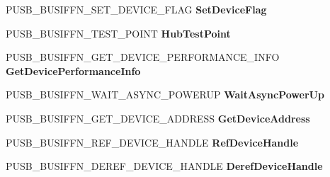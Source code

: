 \begin{DoxyCompactItemize}
\item 
\mbox{\label{struct___u_s_b___b_u_s___i_n_t_e_r_f_a_c_e___h_u_b___v7_ae7d1f58eb68748c858edb586650daecb}} 
P\+U\+S\+B\+\_\+\+B\+U\+S\+I\+F\+F\+N\+\_\+\+S\+E\+T\+\_\+\+D\+E\+V\+I\+C\+E\+\_\+\+F\+L\+AG {\bfseries Set\+Device\+Flag}
\item 
\mbox{\label{struct___u_s_b___b_u_s___i_n_t_e_r_f_a_c_e___h_u_b___v7_ad08bc44414cb5ab7c1513323f5843588}} 
P\+U\+S\+B\+\_\+\+B\+U\+S\+I\+F\+F\+N\+\_\+\+T\+E\+S\+T\+\_\+\+P\+O\+I\+NT {\bfseries Hub\+Test\+Point}
\item 
\mbox{\label{struct___u_s_b___b_u_s___i_n_t_e_r_f_a_c_e___h_u_b___v7_acec99ffe9162b8822dd72b59cb2a1bd1}} 
P\+U\+S\+B\+\_\+\+B\+U\+S\+I\+F\+F\+N\+\_\+\+G\+E\+T\+\_\+\+D\+E\+V\+I\+C\+E\+\_\+\+P\+E\+R\+F\+O\+R\+M\+A\+N\+C\+E\+\_\+\+I\+N\+FO {\bfseries Get\+Device\+Performance\+Info}
\item 
\mbox{\label{struct___u_s_b___b_u_s___i_n_t_e_r_f_a_c_e___h_u_b___v7_ab5c415537aad36865f30361220ccd6ac}} 
P\+U\+S\+B\+\_\+\+B\+U\+S\+I\+F\+F\+N\+\_\+\+W\+A\+I\+T\+\_\+\+A\+S\+Y\+N\+C\+\_\+\+P\+O\+W\+E\+R\+UP {\bfseries Wait\+Async\+Power\+Up}
\item 
\mbox{\label{struct___u_s_b___b_u_s___i_n_t_e_r_f_a_c_e___h_u_b___v7_a9887d0f0821be7408125bccbf6867741}} 
P\+U\+S\+B\+\_\+\+B\+U\+S\+I\+F\+F\+N\+\_\+\+G\+E\+T\+\_\+\+D\+E\+V\+I\+C\+E\+\_\+\+A\+D\+D\+R\+E\+SS {\bfseries Get\+Device\+Address}
\item 
\mbox{\label{struct___u_s_b___b_u_s___i_n_t_e_r_f_a_c_e___h_u_b___v7_acfdb97eefd68ed4ff9219759407773c6}} 
P\+U\+S\+B\+\_\+\+B\+U\+S\+I\+F\+F\+N\+\_\+\+R\+E\+F\+\_\+\+D\+E\+V\+I\+C\+E\+\_\+\+H\+A\+N\+D\+LE {\bfseries Ref\+Device\+Handle}
\item 
\mbox{\label{struct___u_s_b___b_u_s___i_n_t_e_r_f_a_c_e___h_u_b___v7_aadb028a320e3388edac1ebca117d276b}} 
P\+U\+S\+B\+\_\+\+B\+U\+S\+I\+F\+F\+N\+\_\+\+D\+E\+R\+E\+F\+\_\+\+D\+E\+V\+I\+C\+E\+\_\+\+H\+A\+N\+D\+LE {\bfseries Deref\+Device\+Handle}

\end{DoxyCompactItemize}
